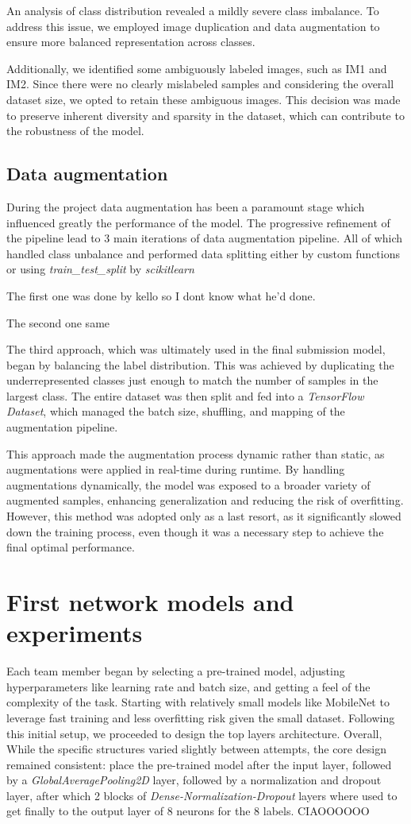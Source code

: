 \documentclass[11pt]{article}
\begin{document}
An analysis of class distribution revealed a mildly severe class imbalance. To address this issue, we employed image duplication and data augmentation to ensure more balanced representation across classes.

Additionally, we identified some ambiguously labeled images, such as IM1 and IM2. Since there were no clearly mislabeled samples and considering the overall dataset size, we opted to retain these ambiguous images. This decision was made to preserve inherent diversity and sparsity in the dataset, which can contribute to the robustness of the model.
\subsection{Data augmentation}
During the project data augmentation has been a paramount stage which influenced greatly the performance of the model. The progressive refinement of the pipeline lead to 3 main iterations of data augmentation pipeline.
All of which handled class unbalance and performed data splitting either by custom functions or using \textit{train\_test\_split} by \textit{scikit\-learn}

The first one was done by kello so I dont know what he'd done.

The second one same

The third approach, which was ultimately used in the final submission model, began by balancing the label distribution. This was achieved by duplicating the underrepresented classes just enough to match the number of samples in the largest class. The entire dataset was then split and fed into a \textit{TensorFlow Dataset}, which managed the batch size, shuffling, and mapping of the augmentation pipeline.

This approach made the augmentation process dynamic rather than static, as augmentations were applied in real-time during runtime. By handling augmentations dynamically, the model was exposed to a broader variety of augmented samples, enhancing generalization and reducing the risk of overfitting. However, this method was adopted only as a last resort, as it significantly slowed down the training process, even though it was a necessary step to achieve the final optimal performance.

\section{First network models and experiments}
Each team member began by selecting a pre-trained model, adjusting hyperparameters like learning rate and batch size, and getting a feel of the complexity of the task.
Starting with relatively small models like MobileNet to leverage fast training and less overfitting risk given the small dataset. 
Following this initial setup, we proceeded to design the top layers architecture. Overall, While the specific structures varied slightly between attempts, the core design remained consistent: place the pre-trained model after the input layer, followed by a \textit{GlobalAveragePooling2D} layer, followed by a normalization and dropout layer, after which 2 blocks of \textit{Dense-Normalization-Dropout} layers where used to get finally to the output layer of 8 neurons for the 8 labels.
CIAOOOOOO
\end{document}

